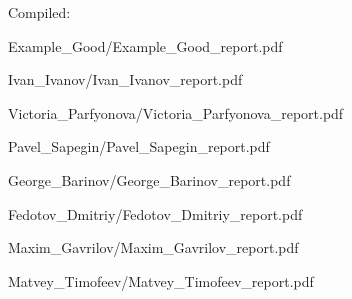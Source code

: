 \documentclass[a4paper]{article}
\begin{document}
Compiled: \DTMnow
\tableofcontents

\clearpage

{Example_Good/Example_Good_report.pdf}

{Ivan_Ivanov/Ivan_Ivanov_report.pdf}

{Victoria_Parfyonova/Victoria_Parfyonova_report.pdf}

{Pavel_Sapegin/Pavel_Sapegin_report.pdf}

{George_Barinov/George_Barinov_report.pdf}

{Fedotov_Dmitriy/Fedotov_Dmitriy_report.pdf}

{Maxim_Gavrilov/Maxim_Gavrilov_report.pdf}

{Matvey_Timofeev/Matvey_Timofeev_report.pdf}
\end{document}
